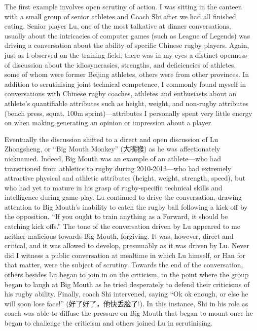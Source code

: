 \begin{CJK}{UTF8}{gbsn}
The first example involves open scrutiny of action. I was sitting in the canteen with a small group of senior athletes and Coach Shi after we had all finished eating.  Senior player Lu, one of the most talkative at dinner conversations, usually about the intricacies of computer games (such as League of Legends) was driving a conversation about the ability of specific Chinese rugby players. Again, just as I observed on the training field, there was in my eyes a distinct openness of discussion about the idiosyncrasies, strengths, and deficiencies of athletes, some of whom were former Beijing athletes, others were from other provinces.  In addition to scrutinising joint technical competence, I commonly found myself in conversations with Chinese rugby coaches, athletes and enthusiasts about an athlete's quantifiable attributes such as height, weight, and non-rugby attributes (bench press, squat, 100m sprint)---attributes I personally spent very little energy on when making generating an opinion or impression about a player.

Eventually the discussion shifted to a direct and open discussion of Lu Zhongsheng, or ``Big Mouth Monkey'' (大嘴猴) as he was affectionately nicknamed. Indeed, Big Mouth was an example of an athlete---who had transitioned from athletics to rugby during 2010-2013---who had extremely attractive physical and athletic attributes (height, weight, strength, speed), but who had yet to mature in his grasp of rugby-specific technical skills and intelligence during game-play.  Lu continued to drive the conversation, drawing attention to Big Mouth's inability to catch the rugby ball following a kick off by the opposition. ``If you ought to train anything as a Forward, it should be catching kick offs.'' The tone of the conversation driven by Lu appeared to me neither malicious towards Big Mouth, forgiving. It was, however, direct and critical, and it was allowed to develop, presumably as it was driven by Lu.  Never did I witness a public conversation at mealtime in which Lu himself, or Han for that matter, were the subject of scrutiny. Towards the end of the conversation, others besides Lu began to join in on the criticism, to the point where the group began to laugh at Big Mouth as he tried desperately to defend their criticisms of his rugby ability.
Finally, coach Shi intervened, saying ``Ok ok enough, or else he will soon lose face!'' (好了好了，他快丢脸了!).  In this instance, Shi in his role as coach was able to diffuse the pressure on Big Mouth that began to mount once he began to challenge the criticism and others joined Lu in scrutinising.


\end{CJK}
